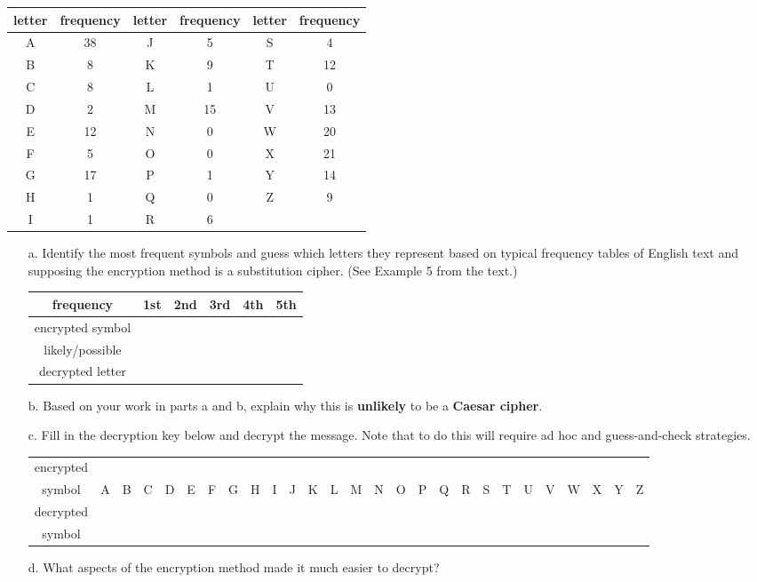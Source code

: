 \documentclass[11pt, oneside]{article}   	%
\begin{document}
	\begin{tabular}{c|c||c|c||c|c}
	letter&frequency&letter&frequency&letter&frequency\\
	\hline \hline
	A&38&J&5&S&4\\
	\hline
	B&8&K&9&T&12\\
	\hline
	C&8&L&1&U&0\\
	\hline
	D&2&M&15&V&13\\
	\hline
	E&12&N&0&W&20\\
	\hline
	F&5&O&0&X&21\\
	\hline
	G&17&P&1&Y&14\\
	\hline
	H&1&Q&0&Z&9\\
	\hline
	I&1&R&6&&\\
	\hline
	\end{tabular}
	\begin{enumerate}
	\item[a.] Identify the most frequent symbols and guess which letters they represent based on typical frequency tables of English text and supposing the encryption method is a substitution cipher. (See Example 5 from the text.) \\
	\begin{tabular}{c||c|c|c|c|c}
	frequency&1st&2nd&3rd&4th&5th\\
	\hline
	encrypted symbol&&&&&\\
	\hline
	likely/possible&&&&&\\
	decrypted letter&&&&&\\
	\end{tabular}
	\item[b.] Based on your work in parts a and b, explain why this is \textbf{unlikely} to be a \textbf{Caesar cipher}. 
	\item[c.] Fill in the decryption key below and decrypt  the message. Note that to do this will require ad hoc and guess-and-check strategies.\\
	
\begingroup
\setlength{\tabcolsep}{4pt}
\renewcommand{\arraystretch}{0.5}
	\hspace*{-0.2in}\begin{tabular}{c|c|c|c|c|c|c|c|c|c|c|c|c|c|c|c|c|c|c|c|c|c|c|c|c|c|c}
	encrypted &&&&&&&&&& &&&&&&&&&& &&&&&&\\
	symbol&A&B&C&D&E&F&G&H&I&J&K&L&M&N&O&P&Q&R&S&T&U&V&W&X&Y&Z\\ \hline
	decrypted &&&&&&&&&& &&&&&&&&&& &&&&&&\\
	symbol&&&&&&&&&& &&&&&&&&&& &&&&&&\\ 
	\end{tabular}
	
\endgroup

\item[d.] What aspects of the encryption method made it much easier to decrypt?
	\end{enumerate}
\end{document}

